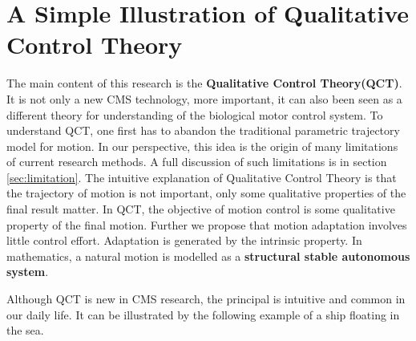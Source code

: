 \section{A Simple Illustration of Qualitative Control Theory}
The main content of this research is the \textbf{Qualitative Control Theory(QCT)}. 
It is not only a new CMS technology, more important, it can also been seen as a different theory for understanding of the biological motor control system.
To understand QCT, one first has to abandon the traditional parametric trajectory model for motion.
In our perspective, this idea is the origin of many limitations of current research methods.
A full discussion of such limitations is in section \ref{sec:limitation}.
The intuitive explanation of Qualitative Control Theory is that the trajectory of motion is not important, 
only some qualitative properties of the final result matter.
In QCT, the objective of motion control is some qualitative property of the final motion.
Further we propose that motion adaptation involves little  control effort. 
Adaptation is generated by the intrinsic property.
In mathematics, a natural motion is modelled as a \textbf{structural stable autonomous system}.

Although QCT is new in CMS research, the principal is intuitive and common in our daily life. 
It can be illustrated by the following example of a ship floating in the sea.

